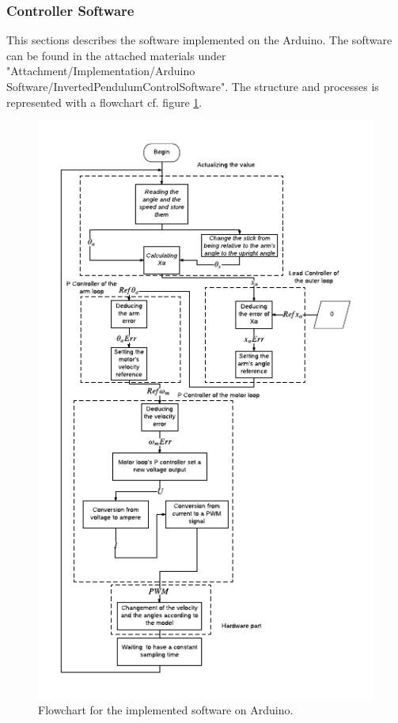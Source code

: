 \subsubsection{Controller Software}
This sections describes the software implemented on the Arduino.  The software can be found in the attached materials under "Attachment/Implementation/Arduino Software/InvertedPendulumControlSoftware". The structure and processes is represented with a flowchart cf. figure \ref{fig:Flowchart}.   
\begin{figure}[htbp]
\centering
\includegraphics[width=1\linewidth]{figures/Flowchart.pdf}
\caption{Flowchart for the implemented software on Arduino.}
\label{fig:Flowchart}
\end{figure}


